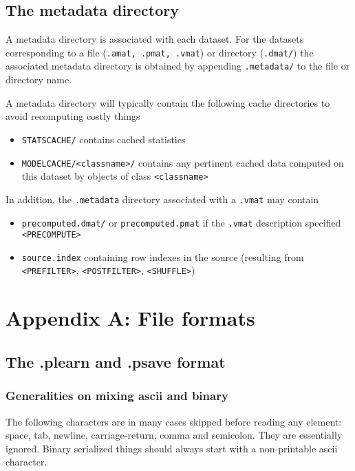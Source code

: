 \documentclass[11pt]{book}
\begin{document}
\section{The metadata directory}

A metadata directory is associated with each dataset.  For the datasets
corresponding to a file ({\tt .amat, .pmat, .vmat}) or directory ({\tt .dmat/}) the
associated metadata directory is obtained by appending {\tt .metadata/} to the
file or directory name.

A metadata directory will typically contain the following cache directories to avoid recomputing costly things

\begin{itemize}
\item \verb!STATSCACHE/! contains cached statistics
\item \verb!MODELCACHE/<classname>/! contains any pertinent cached data computed on this dataset by objects of class \verb!<classname>!
\end{itemize}

In addition, the {\tt .metadata} directory associated with a {\tt .vmat} may contain
\begin{itemize}
\item {\tt precomputed.dmat/} or {\tt precomputed.pmat} if the {\tt .vmat} description specified \verb!<PRECOMPUTE>!
\item {\tt source.index} containing row indexes in the source (resulting from \verb!<PREFILTER>!, \verb!<POSTFILTER>!, \verb!<SHUFFLE>!)
\end{itemize}



\chapter{Appendix A: File formats}

\section{The .plearn and .psave format}

\subsection{Generalities on mixing ascii and binary}

The following characters are in many cases skipped before reading any
element: space, tab, newline, carriage-return, comma and semicolon. They
are essentially ignored. Binary serialized things should always start with
a non-printable ascii character.
\end{document}
